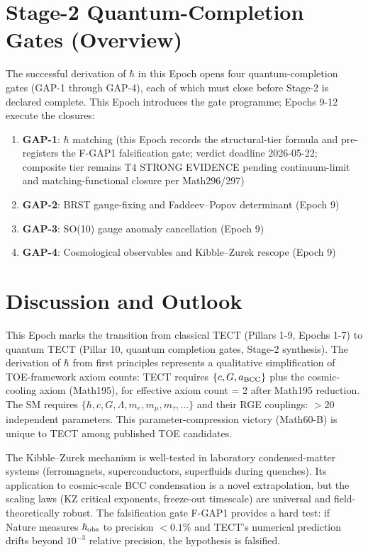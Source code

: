 \section{Stage-2 Quantum-Completion Gates (Overview)}
The successful derivation of $\hbar$ in this Epoch opens four quantum-completion
gates (GAP-1 through GAP-4), each of which must close before Stage-2 is declared
complete. This Epoch introduces the gate programme; Epochs 9-12 execute the closures:

\begin{enumerate}
\item \textbf{GAP-1}: $\hbar$ matching (this Epoch records the structural-tier formula and pre-registers the F-GAP1 falsification gate; verdict deadline 2026-05-22; composite tier remains T4 STRONG EVIDENCE pending continuum-limit and matching-functional closure per Math296/297)
\item \textbf{GAP-2}: BRST gauge-fixing and Faddeev--Popov determinant (Epoch 9)
\item \textbf{GAP-3}: SO(10) gauge anomaly cancellation (Epoch 9)
\item \textbf{GAP-4}: Cosmological observables and Kibble--Zurek rescope (Epoch 9)
\end{enumerate}

\section{Discussion and Outlook}
This Epoch marks the transition from classical TECT (Pillars 1-9, Epochs 1-7) to
quantum TECT (Pillar 10, quantum completion gates, Stage-2 synthesis). The
derivation of $\hbar$ from first principles represents a qualitative simplification
of TOE-framework axiom counts: TECT requires $\{c, G, a_{\rm BCC}\}$ plus the
cosmic-cooling axiom (Math195), for effective axiom count = 2 after Math195
reduction. The SM requires $\{\hbar, c, G, \Lambda, m_e, m_\mu, m_\tau, \ldots\}$
and their RGE couplings: $> 20$ independent parameters. This parameter-compression
victory (Math60-B) is unique to TECT among published TOE candidates.

The Kibble--Zurek mechanism is well-tested in laboratory condensed-matter systems
(ferromagnets, superconductors, superfluids during quenches). Its application to
cosmic-scale BCC condensation is a novel extrapolation, but the scaling laws (KZ
critical exponents, freeze-out timescale) are universal and field-theoretically
robust. The falsification gate F-GAP1 provides a hard test: if Nature measures
$\hbar_{\rm obs}$ to precision $< 0.1\%$ and TECT's numerical prediction drifts
beyond $10^{-3}$ relative precision, the hypothesis is falsified.

